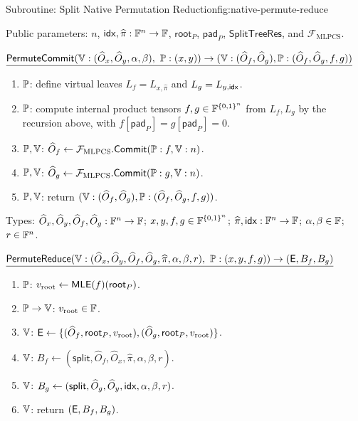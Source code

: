 \begin{protocolbox}{Subroutine: Split Native Permutation Reduction}{fig:native-permute-reduce}
\scriptsize\raggedright
\noindent Public parameters: \(n\), \(\mathsf{idx},\widehat\pi:\mathbb{F}^n\to\mathbb{F}\),
\(\mathsf{root}_P\), \(\mathsf{pad}_P\), \(\mathsf{SplitTreeRes}\), and
\(\mathcal F_{\mathrm{MLPCS}}\).

\smallskip
\noindent\(\underline{\mathsf{PermuteCommit}(\mathbb{V}:(\widehat O_x,\widehat O_y,\alpha,\beta),\ \mathbb{P}:(x,y))\to(\mathbb{V}:(\widehat O_{f},\widehat O_{g}),\mathbb{P}:(\widehat O_{f},\widehat O_{g},f,g))}\)
\begin{enumerate}[leftmargin=0.24in,label=\textbf{P\arabic*.},itemsep=0.06em,topsep=0.06em,parsep=0pt]
  \item \(\mathbb{P}\): define virtual leaves
        \(L_f=L_{x,\widehat\pi}\) and \(L_g=L_{y,\mathsf{idx}}\).
  \item \(\mathbb{P}\): compute internal product tensors
        \(f,g\in\mathbb{F}^{\{0,1\}^n}\) from \(L_f,L_g\) by the recursion above, with
        \(f[\mathsf{pad}_P]=g[\mathsf{pad}_P]=0\).
  \item \(\mathbb{P},\mathbb{V}\): \(\widehat O_{f}\gets
        \mathcal F_{\mathrm{MLPCS}}.\mathsf{Commit}
        (\mathbb{P}:f,\mathbb{V}:n)\).
  \item \(\mathbb{P},\mathbb{V}\): \(\widehat O_{g}\gets
        \mathcal F_{\mathrm{MLPCS}}.\mathsf{Commit}
        (\mathbb{P}:g,\mathbb{V}:n)\).
  \item \(\mathbb{P},\mathbb{V}\): return
        \((\mathbb{V}:(\widehat O_{f},\widehat O_{g}),
        \mathbb{P}:(\widehat O_{f},\widehat O_{g},f,g))\).
\end{enumerate}

\smallskip
\noindent Types: \(\widehat O_x,\widehat O_y,\widehat O_{f},\widehat O_{g}:\mathbb{F}^n\to\mathbb{F}\);
\(x,y,f,g\in\mathbb{F}^{\{0,1\}^n}\); \(\widehat\pi,\mathsf{idx}:\mathbb{F}^n\to\mathbb{F}\);
\(\alpha,\beta\in\mathbb{F}\); \(r\in\mathbb{F}^n\).

\smallskip
\noindent\(\underline{\PermuteReduce(\verifier:(\widehat O_x,\widehat O_y,\widehat O_{f},\widehat O_{g},\widehat\pi,\alpha,\beta,r),\ \prover:(x,y,f,g))\to(\EvalReqs,B_f,B_g)}\)
\begin{enumerate}[leftmargin=0.24in,label=\textbf{R\arabic*.},itemsep=0.06em,topsep=0.06em,parsep=0pt]
  \item \(\mathbb{P}\): \(v_{\mathrm{root}}\gets \mathsf{MLE}(f)(\mathsf{root}_P)\).
  \item \(\mathbb{P}\to\mathbb{V}\): \(v_{\mathrm{root}}\in\mathbb{F}\).
  \item \(\mathbb{V}\): \(\mathsf{E}\gets
        \{(\widehat O_{f},\mathsf{root}_P,v_{\mathrm{root}}),
        (\widehat O_{g},\mathsf{root}_P,v_{\mathrm{root}})\}\).
  \item \(\mathbb{V}\):
        \(B_f\gets(\mathsf{split},\widehat O_{f},\widehat O_x,
        \widehat\pi,\alpha,\beta,r)\).
  \item \(\mathbb{V}\):
        \(B_g\gets(\mathsf{split},\widehat O_{g},\widehat O_y,
        \mathsf{idx},\alpha,\beta,r)\).
  \item \(\mathbb{V}\): return \((\mathsf{E},B_f,B_g)\).
\end{enumerate}
\end{protocolbox}

